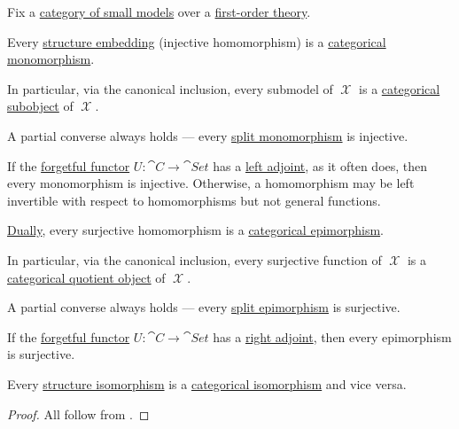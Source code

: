 \begin{proposition}\label{thm:first_order_categorical_invertibility}
  Fix a \hyperref[def:category_of_small_first_order_models]{category of small models} over a \hyperref[def:first_order_theory]{first-order theory}.

  \begin{thmenum}
     Every \hyperref[def:set_valued_map/empty]{} \hyperref[def:first_order_embedding]{structure embedding} (injective homomorphism) is a \hyperref[def:morphism_invertibility/left_cancellative]{categorical monomorphism}.

    In particular, via the canonical inclusion, every submodel of \( \mscrX \) is a \hyperref[def:subobject_and_quotient]{categorical subobject} of \( \mscrX \).

    A partial converse always holds --- every \hyperref[def:morphism_invertibility/left_cancellative]{split monomorphism} is injective.

    If the \hyperref[def:concrete_category]{forgetful functor} \( U: \cat{C} \to \cat{Set} \) has a \hyperref[def:category_adjunction]{left adjoint}, as it often does, then every monomorphism is injective. Otherwise, a homomorphism may be left invertible with respect to homomorphisms but not general functions.

     \hyperref[thm:categorical_principle_of_duality]{Dually}, every surjective homomorphism is a \hyperref[def:morphism_invertibility/right_cancellative]{categorical epimorphism}.

    In particular, via the canonical inclusion, every surjective function of \( \mscrX \) is a \hyperref[def:subobject_and_quotient]{categorical quotient object} of \( \mscrX \).

    A partial converse always holds --- every \hyperref[def:morphism_invertibility/right_cancellative]{split epimorphism} is surjective.

    If the \hyperref[def:concrete_category]{forgetful functor} \( U: \cat{C} \to \cat{Set} \) has a \hyperref[def:category_adjunction]{right adjoint}, then every epimorphism is surjective.

     Every \hyperref[def:first_order_embedding]{structure isomorphism} is a \hyperref[def:morphism_invertibility/isomorphism]{categorical isomorphism} and vice versa.
  \end{thmenum}
\end{proposition}
\begin{proof}
  All follow from .
\end{proof}

